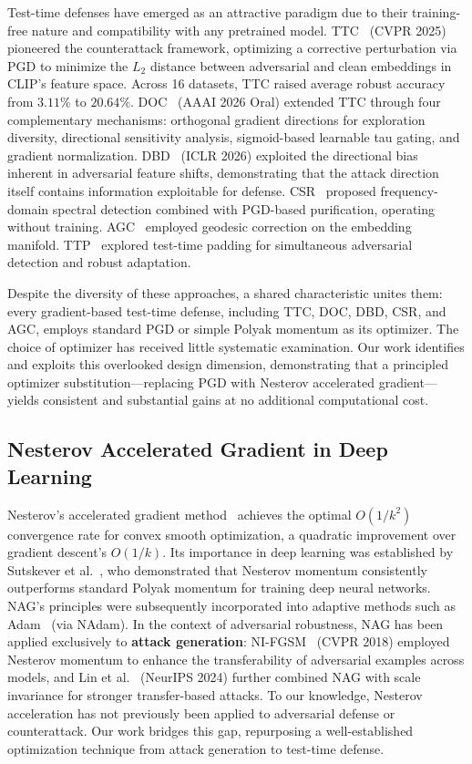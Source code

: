 \documentclass[12pt,a4paper]{article}
\begin{document}
Test-time defenses have emerged as an attractive paradigm due to their training-free nature and compatibility with any pretrained model. TTC~\cite{xing2025clip} (CVPR 2025) pioneered the counterattack framework, optimizing a corrective perturbation via PGD to minimize the $L_2$ distance between adversarial and clean embeddings in CLIP's feature space. Across 16 datasets, TTC raised average robust accuracy from $3.11\%$ to $20.64\%$. DOC~\cite{jiang2026diversifying} (AAAI 2026 Oral) extended TTC through four complementary mechanisms: orthogonal gradient directions for exploration diversity, directional sensitivity analysis, sigmoid-based learnable tau gating, and gradient normalization. DBD~\cite{liu2026directional} (ICLR 2026) exploited the directional bias inherent in adversarial feature shifts, demonstrating that the attack direction itself contains information exploitable for defense. CSR~\cite{nie2025contrastive} proposed frequency-domain spectral detection combined with PGD-based purification, operating without training. AGC~\cite{li2026agc} employed geodesic correction on the embedding manifold. TTP~\cite{li2026ttp} explored test-time padding for simultaneous adversarial detection and robust adaptation.

Despite the diversity of these approaches, a shared characteristic unites them: every gradient-based test-time defense, including TTC, DOC, DBD, CSR, and AGC, employs standard PGD or simple Polyak momentum as its optimizer. The choice of optimizer has received little systematic examination. Our work identifies and exploits this overlooked design dimension, demonstrating that a principled optimizer substitution---replacing PGD with Nesterov accelerated gradient---yields consistent and substantial gains at no additional computational cost.

\subsection{Nesterov Accelerated Gradient in Deep Learning}

Nesterov's accelerated gradient method~\cite{nesterov1983method} achieves the optimal $O(1/k^2)$ convergence rate for convex smooth optimization, a quadratic improvement over gradient descent's $O(1/k)$. Its importance in deep learning was established by Sutskever et al.~\cite{sutskever2013importance}, who demonstrated that Nesterov momentum consistently outperforms standard Polyak momentum for training deep neural networks. NAG's principles were subsequently incorporated into adaptive methods such as Adam~\cite{kingma2015adam} (via NAdam). In the context of adversarial robustness, NAG has been applied exclusively to \textbf{attack generation}: NI-FGSM~\cite{dong2018boosting} (CVPR 2018) employed Nesterov momentum to enhance the transferability of adversarial examples across models, and Lin et al.~\cite{lin2024nesterov} (NeurIPS 2024) further combined NAG with scale invariance for stronger transfer-based attacks. To our knowledge, Nesterov acceleration has not previously been applied to adversarial defense or counterattack. Our work bridges this gap, repurposing a well-established optimization technique from attack generation to test-time defense.
\end{document}
